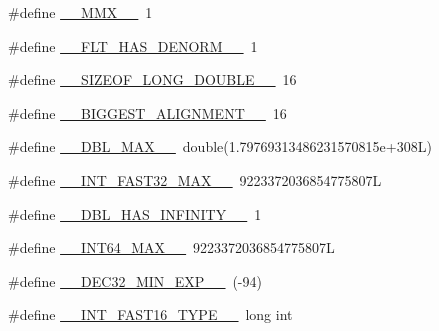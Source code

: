 \begin{DoxyCompactItemize}
\item 
\#define \hyperlink{build-analizer__host-_desktop___qt__5__9__0___g_c_c__64bit-debug_2moc__predefs_8h_ab61dd6e368adb90e2eff5739188b0bcb}{\+\_\+\+\_\+\+M\+M\+X\+\_\+\+\_\+}~1
\item 
\#define \hyperlink{build-analizer__host-_desktop___qt__5__9__0___g_c_c__64bit-debug_2moc__predefs_8h_a82a2c3ff271d1685b450975ffa68544a}{\+\_\+\+\_\+\+F\+L\+T\+\_\+\+H\+A\+S\+\_\+\+D\+E\+N\+O\+R\+M\+\_\+\+\_\+}~1
\item 
\#define \hyperlink{build-analizer__host-_desktop___qt__5__9__0___g_c_c__64bit-debug_2moc__predefs_8h_aae92712264b830cd7d24d4b81d502ffb}{\+\_\+\+\_\+\+S\+I\+Z\+E\+O\+F\+\_\+\+L\+O\+N\+G\+\_\+\+D\+O\+U\+B\+L\+E\+\_\+\+\_\+}~16
\item 
\#define \hyperlink{build-analizer__host-_desktop___qt__5__9__0___g_c_c__64bit-debug_2moc__predefs_8h_a2c25ec0f0ae74f9d8a7c373288a28dd1}{\+\_\+\+\_\+\+B\+I\+G\+G\+E\+S\+T\+\_\+\+A\+L\+I\+G\+N\+M\+E\+N\+T\+\_\+\+\_\+}~16
\item 
\#define \hyperlink{build-analizer__host-_desktop___qt__5__9__0___g_c_c__64bit-debug_2moc__predefs_8h_a711d7b7f27671b10b11a74c37f653ad7}{\+\_\+\+\_\+\+D\+B\+L\+\_\+\+M\+A\+X\+\_\+\+\_\+}~double(1.\+79769313486231570815e+308\+L)
\item 
\#define \hyperlink{build-analizer__host-_desktop___qt__5__9__0___g_c_c__64bit-debug_2moc__predefs_8h_a84479d2bbe1d7286f406fcc302f41376}{\+\_\+\+\_\+\+I\+N\+T\+\_\+\+F\+A\+S\+T32\+\_\+\+M\+A\+X\+\_\+\+\_\+}~9223372036854775807\+L
\item 
\#define \hyperlink{build-analizer__host-_desktop___qt__5__9__0___g_c_c__64bit-debug_2moc__predefs_8h_a3dd03066dbb351dfa51353c80a7902a2}{\+\_\+\+\_\+\+D\+B\+L\+\_\+\+H\+A\+S\+\_\+\+I\+N\+F\+I\+N\+I\+T\+Y\+\_\+\+\_\+}~1
\item 
\#define \hyperlink{build-analizer__host-_desktop___qt__5__9__0___g_c_c__64bit-debug_2moc__predefs_8h_aa3f186f612efe5edfcc371c95617f06f}{\+\_\+\+\_\+\+I\+N\+T64\+\_\+\+M\+A\+X\+\_\+\+\_\+}~9223372036854775807\+L
\item 
\#define \hyperlink{build-analizer__host-_desktop___qt__5__9__0___g_c_c__64bit-debug_2moc__predefs_8h_a79e289c54a8c9851b2b118d442bbc26c}{\+\_\+\+\_\+\+D\+E\+C32\+\_\+\+M\+I\+N\+\_\+\+E\+X\+P\+\_\+\+\_\+}~(-\/94)
\item 
\#define \hyperlink{build-analizer__host-_desktop___qt__5__9__0___g_c_c__64bit-debug_2moc__predefs_8h_a6a4d11835d03027f3929b84fe7b55bf6}{\+\_\+\+\_\+\+I\+N\+T\+\_\+\+F\+A\+S\+T16\+\_\+\+T\+Y\+P\+E\+\_\+\+\_\+}~long int

\end{DoxyCompactItemize}
